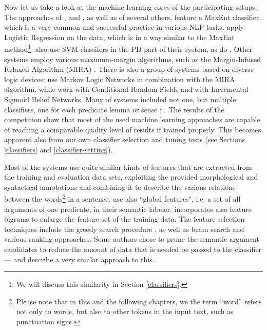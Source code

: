 \documentclass[12pt,notitlepage]{report}
\begin{document}
Now let us take a look at the machine learning cores of the participating setups: The approaches of \citet{zhao09}, \citet{che09} and \citet{chen09}, as well as of several others, feature a MaxEnt classifier, which is a very common and successful practice in various NLP tasks. \citet{nugues09} apply Logistic Regression on the data, which is in a way similar to the MaxEnt method\footnote{We will discuss this similarity in Section \ref{classifiers}.}. \citet{che09} also use SVM classifers in the PD part of their system, as do \citet{tackstrom09}. Other systems \citep{bohnet09,asahara09} employ various maximum-margin algorithms, such as the Margin-Infused Relaxed Algorithm (MIRA) \citep{crammer03}. There is also a group of systems based on diverse logic devices: \citet{meza-ruiz09} use Markov Logic Networks in combination with the MIRA algorithm, while \citet{moreau09} work with Conditional Random Fields and \citet{merlo09} with Incremental Sigmoid Belief Networks. Many of systems included not one, but multiple classifiers, one for each predicate lemma or sense \citep{che09}; \citep{nugues09}. The results of the competition show that most of the used machine learning approaches are capable of reaching a comparable quality level of results if trained properly. This becomes apparent also from our own classifier selection and tuning tests (see Sections \ref{classifiers} and \ref{classifier-setting}).

Most of the systems use quite similar kinds of features that are extracted from the training and evaluation data sets, exploiting the provided morphological and syntactical annotations and combining it to describe the various relations between the words\footnote{Please note that in this and the following chapters, we the term ``word'' refers not only to words, but also to other tokens in the input text, such as punctuation signs.} in a sentence. \citet{asahara09} use also ``global features", i.e. a set of all arguments of one predicate, in their semantic labeler. \citet{nugues09} incorporates also feature bigrams to enlarge the feature set of the training data. The feature selection techniques include the greedy search procedure \citep[among others]{nugues09,zeman09}, as well as beam search \citep[][and others]{merlo09,nugues09} and various ranking approaches. Some authors chose to prune the semantic argument candidates to reduce the amount of data that is needed be passed to the classifier --- \citet{zhao09} and \citet{asahara09} describe a very similar approach to this.
\end{document}
